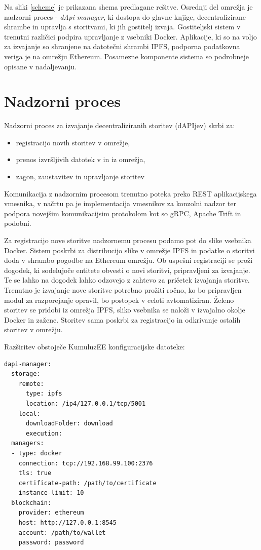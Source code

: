 \documentclass[a4paper, 12pt]{book}
\begin{document}
Na sliki \ref{scheme} je prikazana shema predlagane rešitve. Osrednji del omrežja je nadzorni proces - 
\textit{dApi manager}, ki dostopa do glavne knjige, decentralizirane shrambe in upravlja s storitvami, ki jih gostitelj izvaja.
Gostiteljski sistem v trenutni različici podpira upravljanje z vsebniki Docker.
Aplikacije, ki so na voljo za izvajanje so shranjene na datotečni shrambi IPFS, podporna podatkovna veriga je na omrežju Ethereum. Posamezne komponente sistema so podrobneje opisane v nadaljevanju.

\section{Nadzorni proces}
Nadzorni proces za izvajanje decentraliziranih storitev (dAPIjev) skrbi za:
\begin{itemize}
	\item registracijo novih storitev v omrežje, 
	\item prenos izvršljivih datotek v in iz omrežja,
	\item zagon, zaustavitev in upravljanje storitev
\end{itemize}

Komunikacija z nadzornim procesom trenutno poteka preko REST aplikacijskega vmesnika, v načrtu pa je implementacija vmesnikov za konzolni nadzor ter podpora novejšim komunikacijsim protokolom kot so gRPC, Apache Trift in podobni.

Za registracijo nove storitve nadzornemu procesu podamo pot do slike vsebnika Docker.
Sistem poskrbi za distribucijo slike v omrežje IPFS in podatke o storitvi doda v shrambo pogodbe na Ethereum omrežju.
Ob uspešni registraciji se proži dogodek, ki sodelujoče entitete obvesti o novi storitvi, pripravljeni za izvajanje.
Te se lahko na dogodek lahko odzovejo z zahtevo za pričetek izvajanja storitve.
Trenutno je izvajanje nove storitve potrebno prožiti ročno, ko bo pripravljen modul za razporejanje opravil, bo postopek v celoti avtomatiziran.
Želeno storitev se pridobi iz omrežja IPFS, sliko vsebnika se naloži v izvajalno okolje Docker in zažene.
Storitev sama poskrbi za registracijo in odkrivanje ostalih storitev v omrežju.

Razširitev obstoječe KumuluzEE konfiguracijske datoteke:

\begin{lstlisting}
dapi-manager:
  storage:
    remote:
      type: ipfs
      location: /ip4/127.0.0.1/tcp/5001
    local:
      downloadFolder: download
      execution:
  managers:
  - type: docker
    connection: tcp://192.168.99.100:2376
    tls: true
    certificate-path: /path/to/certificate
    instance-limit: 10
  blockchain:
    provider: ethereum
    host: http://127.0.0.1:8545
    account: /path/to/wallet
    password: password
\end{lstlisting}
\end{document}

